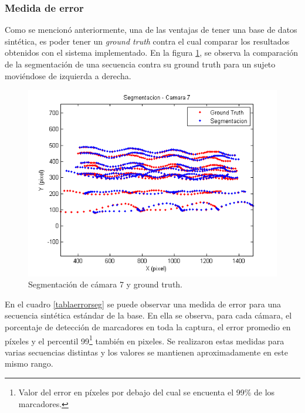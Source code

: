 \subsubsection{Medida de error}
Como se mencionó anteriormente, una de las ventajas de tener una base de datos sintética, es poder tener un \textit{ground truth} contra el cual comparar los resultados obtenidos con el sistema implementado. En la figura \ref{ejMedErr}, se observa la comparación de la segmentación de una secuencia contra su ground truth para un sujeto moviéndose de izquierda a derecha.

\begin{figure}[H]
\begin{center}
\includegraphics[scale=0.6]{img/imagen_segmentacion_cam7_8_07_100_200.png}
\end{center}
\caption{Segmentación de cámara 7 y ground truth.}
\label{ejMedErr}
\end{figure}

En el cuadro \ref{tablaerrorseg} se puede observar una medida de error para una secuencia sintética estándar de la base. En ella se observa, para cada cámara, el porcentaje de detección de marcadores en toda la captura, el error promedio en píxeles y el percentil 99\footnote{Valor del error en píxeles por debajo del cual se encuenta el 99\% de los marcadores.} también en pixeles. Se realizaron estas medidas para varias secuencias distintas y los valores se mantienen aproximadamente en este mismo rango.

